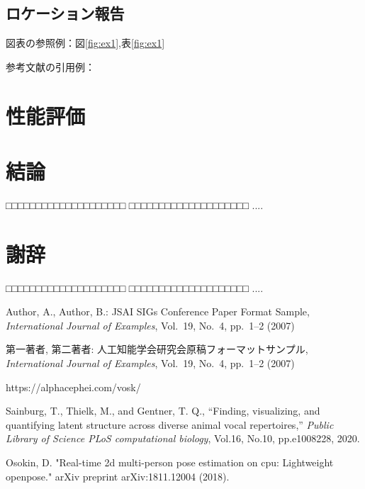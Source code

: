 \documentclass[a4j]{jarticle}
\begin{document}
\subsection{ロケーション報告}


図表の参照例：図\ref{fig:ex1},表\ref{fig:ex1}

参考文献の引用例：\cite{Sample1}\cite{Sample2}


\section{性能評価}


\section{結論}
□□□□□□□□□□□□□□□□□□□□
□□□□□□□□□□□□□□□□□□□□
....


\section*{謝辞}

□□□□□□□□□□□□□□□□□□□□
□□□□□□□□□□□□□□□□□□□□
....


\begin{thebibliography}{99}

Author, A., Author, B.:
JSAI SIGs Conference Paper Format Sample,
{\it International Journal of Examples}, Vol.~19, No.~4, pp.~1--2 (2007)

第一著者, 第二著者:
人工知能学会研究会原稿フォーマットサンプル,
{\it International Journal of Examples}, Vol.~19, No.~4, pp.~1--2 (2007)

https://alphacephei.com/vosk/


Sainburg, T., Thielk, M., and Gentner, T. Q.,
“Finding, visualizing, and quantifying latent structure across diverse animal vocal repertoires,”
{\it Public Library of Science PLoS computational biology},
Vol.16,
No.10,
pp.e1008228,
2020.

Osokin, D. "Real-time 2d multi-person pose estimation on cpu: Lightweight openpose." arXiv preprint arXiv:1811.12004 (2018).

\end{thebibliography}
\end{document}
